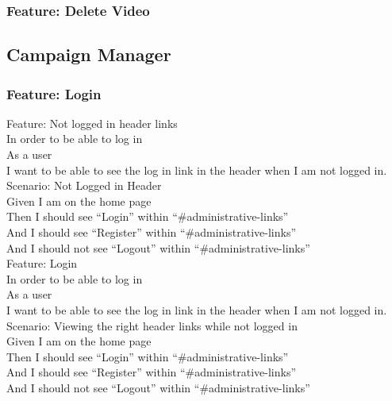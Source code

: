 \documentclass[12pt]{article}
\begin{document}
\subsubsection{Feature: Delete Video}

\subsection{Campaign Manager}

\subsubsection{Feature: Login}

Feature: Not logged in header links \\
In order to be able to log in \\
As a user \\
I want to be able to see the log in link in the header when I am not logged in. \\

Scenario: Not Logged in Header  \\
Given I am on the home page \\
Then I should see ``Login'' within ``\#administrative-links'' \\
And I should see ``Register'' within ``\#administrative-links'' \\
And I should not see ``Logout'' within ``\#administrative-links'' \\

Feature: Login \\
  In order to be able to log in \\
  As a user \\
  I want to be able to see the log in link in the header when I am not logged in. \\

Scenario: Viewing the right header links while not logged in  \\
  Given I am on the home page \\
  Then I should see ``Login'' within ``\#administrative-links'' \\
  And I should see ``Register'' within ``\#administrative-links'' \\
  And I should not see ``Logout'' within ``\#administrative-links'' \\
\end{document}
